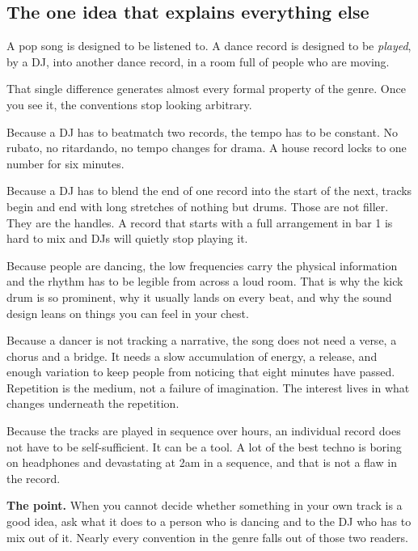 \subsection{The one idea that explains everything else}\label{th01_what_edm_is-the-one-idea-that-explains-everything-else}

A pop song is designed to be listened to. A dance record is designed to be \emph{played}, by a
DJ, into another dance record, in a room full of people who are moving.

That single difference generates almost every formal property of the genre. Once you see
it, the conventions stop looking arbitrary.

Because a DJ has to beatmatch two records, the tempo has to be constant. No rubato, no
ritardando, no tempo changes for drama. A house record locks to one number for six minutes.

Because a DJ has to blend the end of one record into the start of the next, tracks begin
and end with long stretches of nothing but drums. Those are not filler. They are the
handles. A record that starts with a full arrangement in bar 1 is hard to mix and DJs will
quietly stop playing it.

Because people are dancing, the low frequencies carry the physical information and the
rhythm has to be legible from across a loud room. That is why the kick drum is so
prominent, why it usually lands on every beat, and why the sound design leans on things you
can feel in your chest.

Because a dancer is not tracking a narrative, the song does not need a verse, a chorus and
a bridge. It needs a slow accumulation of energy, a release, and enough variation to keep
people from noticing that eight minutes have passed. Repetition is the medium, not a
failure of imagination. The interest lives in what changes underneath the repetition.

Because the tracks are played in sequence over hours, an individual record does not have to
be self-sufficient. It can be a tool. A lot of the best techno is boring on headphones and
devastating at 2am in a sequence, and that is not a flaw in the record.

\begin{intuitionbox}
\textbf{The point.} When you cannot decide whether something in your own track is a good idea,
ask what it does to a person who is dancing and to the DJ who has to mix out of it. Nearly
every convention in the genre falls out of those two readers.
\end{intuitionbox}

